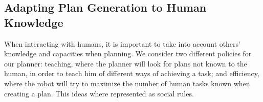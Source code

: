 



\subsection{Adapting Plan Generation to Human Knowledge}
\label{subsec-plan_generation-adapting_knowledge}
When interacting with humans, it is important to take into account others' knowledge and capacities when planning. We consider two different policies for our planner: teaching, where the planner will look for plans not known to the human, in order to teach him of different ways of achieving a task; and efficiency, where the robot will try to maximize the number of human tasks known when creating a plan. This ideas where represented as social rules.

